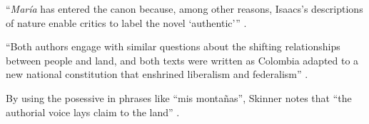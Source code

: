 \documentclass[12pt]{article}
\title{}
\makeatletter
\newcommand\iraggedright{%
	\let\\\@centercr\@rightskip\@flushglue \rightskip\@rightskip
	\leftskip\z@skip}
\makeatother
\begin{document}
	\makeheader
	\iraggedright
	
\enquote{\textit{María} has entered the canon because, among other reasons, Isaacs's descriptions of nature enable critics to label the novel \enquote{authentic}} \cite[13]{Skinner2014}.

\enquote{Both authors engage with similar questions about the shifting relationships between people and land, and both texts were written as Colombia adapted to a new national constitution that enshrined liberalism and federalism} \cite[13]{Skinner2014}.

By using the posessive in phrases like \enquote{mis montañas}, Skinner notes that \enquote{the authorial voice lays claim to the land} \cite[15]{Skinner2014}.

\makeworkscited
\listoftodos
\end{document}
